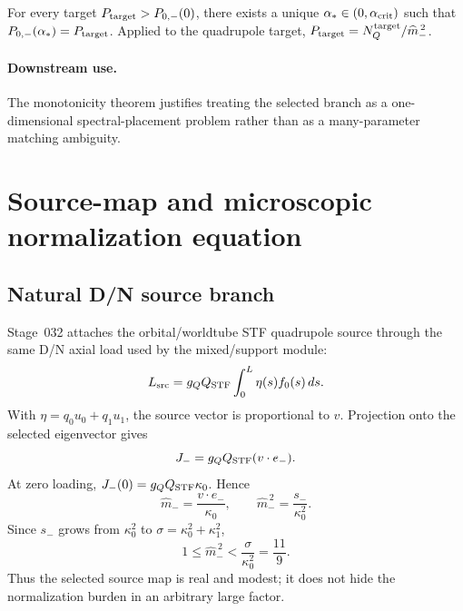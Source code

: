 \begin{theorem}
\label{thm:part02-unique-crossing}
For every target \(P_{\rm target}>P_{0,-}(0)\), there exists a unique \(\alpha_*\in(0,\alpha_{\rm crit})\) such that \(P_{0,-}(\alpha_*)=P_{\rm target}\).  Applied to the quadrupole target, \(P_{\rm target}=N_Q^{\rm target}/\widehat m_-^{\,2}\).
\end{theorem}

\paragraph{Downstream use.}
The monotonicity theorem justifies treating the selected branch as a one-dimensional spectral-placement problem rather than as a many-parameter matching ambiguity.

\section{Source-map and microscopic normalization equation}
\label{sec:part02_conservative_response:source-map-and-microscopic-normalization-equation}

\subsection{Natural D/N source branch}
\label{subsec:part02-stage032-source-map}

Stage~032 attaches the orbital/worldtube STF quadrupole source through the same D/N axial load used by the mixed/support module:
\begin{equation}
L_{\rm src}=g_QQ_{\rm STF}\int_0^L\eta(s)f_0(s)\,ds.
\end{equation}
With \(\eta=q_0u_0+q_1u_1\), the source vector is proportional to \(v\).  Projection onto the selected eigenvector gives
\begin{equation}
J_-=g_QQ_{\rm STF}(v\cdot e_-).
\end{equation}
At zero loading, \(J_-(0)=g_QQ_{\rm STF}\kappa_0\).  Hence
\begin{equation}
\label{eq:part02-mhat-minus}
\boxed{
\widehat m_-=\frac{v\cdot e_-}{\kappa_0},
\qquad
\widehat m_-^{\,2}=\frac{s_-}{\kappa_0^2}}.
\end{equation}
Since \(s_-\) grows from \(\kappa_0^2\) to \(\sigma=\kappa_0^2+\kappa_1^2\),
\begin{equation}
\label{eq:part02-mhat-bound}
\boxed{
1\leq\widehat m_-^{\,2}<\frac{\sigma}{\kappa_0^2}=\frac{11}{9}}.
\end{equation}
Thus the selected source map is real and modest; it does not hide the normalization burden in an arbitrary large factor.


